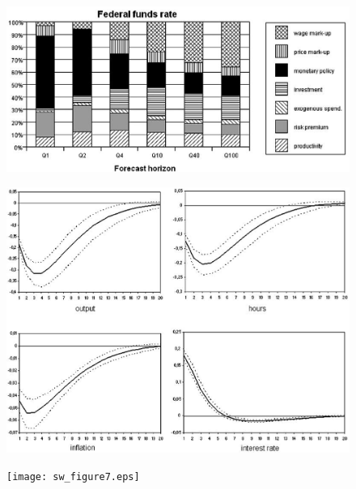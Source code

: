 \documentclass{beamer}
\begin{document}
\begin{frame}
  \begin{figure}
    \includegraphics[scale=.8]{sw_figure1_interest.eps}
  \end{figure}
\end{frame}

\begin{frame}
  \begin{figure}
    \includegraphics[scale=.8]{sw_figure6.eps}
  \end{figure}
\end{frame}

\begin{frame}
  \begin{figure}
    \texttt{[image: sw\_figure7.eps]}
  \end{figure}
\end{frame}
\end{document}
